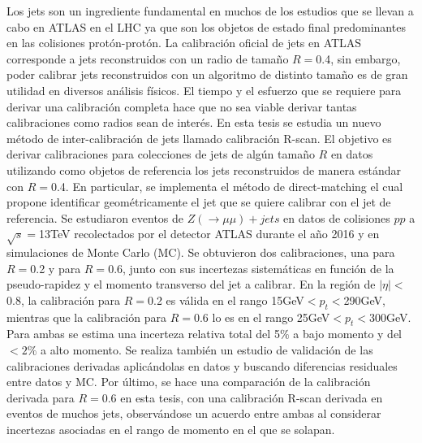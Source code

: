 


Los jets son un ingrediente fundamental en muchos de los estudios que se llevan a cabo en ATLAS en el LHC ya que son los objetos de estado final predominantes en las colisiones protón-protón. La calibración oficial de jets en ATLAS corresponde a jets reconstruidos con un radio de tamaño $R=$0.4, sin embargo, poder calibrar jets reconstruidos con un algoritmo de distinto tamaño es de gran utilidad en diversos análisis físicos. El tiempo y el esfuerzo que se requiere para derivar una calibración completa hace que no sea viable derivar tantas calibraciones como radios sean de interés. En esta tesis se estudia un nuevo método de inter-calibración de jets llamado calibración R-scan. El objetivo es derivar calibraciones para colecciones de jets de algún tamaño $R$ en datos utilizando como objetos de referencia los jets reconstruidos de manera estándar con $R=$0.4. En particular, se implementa el método de direct-matching el cual propone identificar geométricamente el jet que se quiere calibrar con el jet de referencia. Se estudiaron eventos de $Z(\rightarrow\mu\mu)+jets$ en datos de colisiones $pp$ a $\sqrt{s}=$13TeV recolectados por el detector ATLAS durante el año 2016 y en simulaciones de Monte Carlo (MC). Se obtuvieron dos calibraciones, una para $R=$0.2 y para $R=$0.6, junto con sus incertezas sistemáticas en función de la pseudo-rapidez y el momento transverso del jet a calibrar. En la región de $|\eta|<$0.8, la calibración para $R=$0.2 es válida en el rango 15GeV$<p_t<$290GeV, mientras que la calibración para $R=$0.6 lo es en el rango 25GeV$<p_t<$300GeV. Para ambas se estima una incerteza relativa total del 5$\%$ a bajo momento y del $<2\%$ a alto momento. Se realiza también un estudio de validación de las calibraciones derivadas aplicándolas en datos y buscando diferencias residuales entre datos y MC. Por último, se hace una comparación de la calibración derivada para $R=$0.6 en esta tesis, con una calibración R-scan derivada en eventos de muchos jets, observándose un acuerdo entre ambas al considerar incertezas asociadas en el rango de momento en el que se solapan. 

